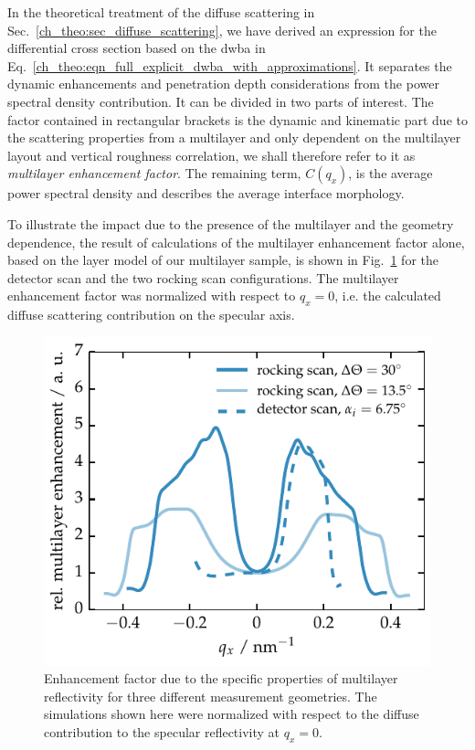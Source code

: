 In the theoretical treatment of the diffuse scattering in Sec.~\ref{ch_theo:sec_diffuse_scattering}, we have derived an expression for the differential cross section based on the \gls{dwba} in Eq.~\eqref{ch_theo:eqn_full_explicit_dwba_with_approximations}. It separates the dynamic enhancements and penetration depth considerations from the power spectral density contribution. It can be divided in two parts of interest. The factor contained in rectangular brackets is the dynamic and kinematic part due to the scattering properties from a multilayer and only dependent on the multilayer layout and vertical roughness correlation, we shall therefore refer to it as \emph{multilayer enhancement factor}. The remaining term, $C(q_x)$, is the average power spectral density and describes the average interface morphology.

To illustrate the impact due to the presence of the multilayer and the geometry dependence, the result of calculations of the multilayer enhancement factor alone, based on the layer model of our multilayer sample, is shown in Fig.~\ref{ch_diff:fig_PTB17_multilayer_enhancement_factor} for the detector scan and the two rocking scan configurations. The multilayer enhancement factor was normalized with respect to $q_x=0$, i.e. the calculated diffuse scattering contribution on the specular axis.
\begin{figure}[htbp]
	\includegraphics{img/PTB17_multilayer_enhancement_factor} \caption{Enhancement factor due to the specific properties of multilayer reflectivity for three different measurement geometries. The simulations shown here were normalized with respect to the diffuse contribution to the specular reflectivity at $q_x=0$.} \label{ch_diff:fig_PTB17_multilayer_enhancement_factor} 
\end{figure}
